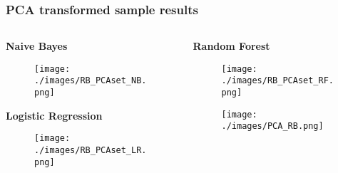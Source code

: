 \documentclass[10pt]{beamer}
\begin{document}
\begin{frame}[c, squeeze] \frametitle{PCA transformed sample results}
\scriptsize
 \begin{columns}
\begin{column}{0.5\textwidth}
\begin{center}
\textbf{Naive Bayes} 
\begin{figure}
 \texttt{[image: ./images/RB\_PCAset\_NB.png]}
\end{figure}
\textbf{Logistic Regression} %
\begin{figure}
 \texttt{[image: ./images/RB\_PCAset\_LR.png]}
\end{figure}
\end{center}
\end{column}

\begin{column}{0.5\textwidth}
\begin{center}
\textbf{Random Forest}%
\begin{figure}
 \texttt{[image: ./images/RB\_PCAset\_RF.png]}
\end{figure}

 \begin{figure}
 \centering
 \texttt{[image: ./images/PCA\_RB.png]}
\end{figure}
\end{center}
\end{column}
\end{columns}
\end{frame}
\end{document}
